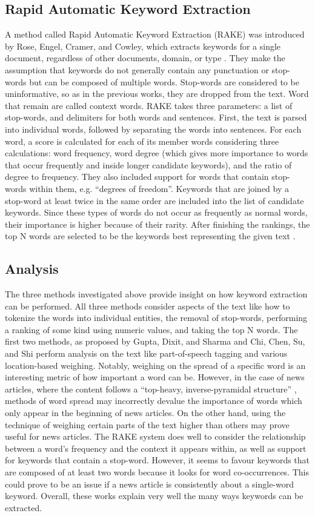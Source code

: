 \documentclass[11pt,titlepage]{report}
\begin{document}
\subsection{Rapid Automatic Keyword Extraction}
A method called Rapid Automatic Keyword Extraction (RAKE) was introduced by Rose, Engel, Cramer, and Cowley, which extracts keywords for a single document, regardless of other documents, domain, or type \cite{RAKE}. They make the assumption that keywords do not generally contain any punctuation or stop-words but can be composed of multiple words. Stop-words are considered to be uninformative, so as in the previous works, they are dropped from the text. Word that remain are called context words. RAKE takes three parameters: a list of stop-words, and delimiters for both words and sentences. First, the text is parsed into individual words, followed by separating the words into sentences. For each word, a score is calculated for each of its member words considering three calculations: word frequency, word degree (which gives more importance to words that occur frequently and inside longer candidate keywords), and the ratio of degree to frequency. They also included support for words that contain stop-words within them, e.g. “degrees of freedom”. Keywords that are joined by a stop-word at least twice in the same order are included into the list of candidate keywords. Since these types of words do not occur as frequently as normal words, their importance is higher because of their rarity. After finishing the rankings, the top N words are selected to be the keywords best representing the given text \cite{RAKE}.
\subsection{Analysis}
The three methods investigated above provide insight on how keyword extraction can be performed. All three methods consider aspects of the text like how to tokenize the words into individual entities, the removal of stop-words, performing a ranking of some kind using numeric values, and taking the top N words. The first two methods, as proposed by Gupta, Dixit, and Sharma and Chi, Chen, Su, and Shi perform analysis on the text like part-of-speech tagging and various location-based weighing. Notably, weighing on the spread of a specific word is an interesting metric of how important a word can be. However, in the case of news articles, where the content follows a “top-heavy, inverse-pyramidal structure” \cite{zhao}, methods of word spread may incorrectly devalue the importance of words which only appear in the beginning of news articles. On the other hand, using the technique of weighing certain parts of the text higher than others may prove useful for news articles. The RAKE system does well to consider the relationship between a word’s frequency and the context it appears within, as well as support for keywords that contain a stop-word. However, it seems to favour keywords that are composed of at least two words because it looks for word co-occurrences. This could prove to be an issue if a news article is consistently about a single-word keyword. Overall, these works explain very well the many ways keywords can be extracted.
\end{document}
